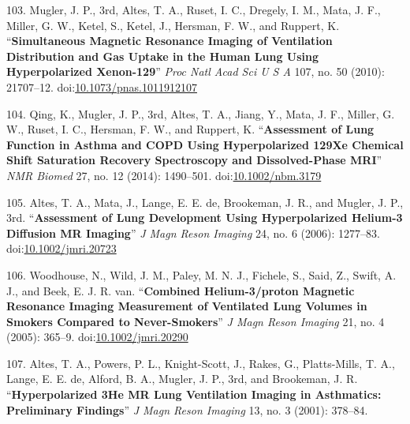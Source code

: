 \documentclass[11pt,]{article}
\begin{document}
\hypertarget{ref-Mugler:2010aa}{}
103. Mugler, J. P., 3rd, Altes, T. A., Ruset, I. C., Dregely, I. M.,
Mata, J. F., Miller, G. W., Ketel, S., Ketel, J., Hersman, F. W., and
Ruppert, K. ``\textbf{Simultaneous Magnetic Resonance Imaging of
Ventilation Distribution and Gas Uptake in the Human Lung Using
Hyperpolarized Xenon-129}'' \emph{Proc Natl Acad Sci U S A} 107, no. 50
(2010): 21707--12.
doi:\href{https://doi.org/10.1073/pnas.1011912107}{10.1073/pnas.1011912107}

\hypertarget{ref-Qing:2014ab}{}
104. Qing, K., Mugler, J. P., 3rd, Altes, T. A., Jiang, Y., Mata, J. F.,
Miller, G. W., Ruset, I. C., Hersman, F. W., and Ruppert, K.
``\textbf{Assessment of Lung Function in Asthma and COPD Using
Hyperpolarized 129Xe Chemical Shift Saturation Recovery Spectroscopy and
Dissolved-Phase MRI}'' \emph{NMR Biomed} 27, no. 12 (2014): 1490--501.
doi:\href{https://doi.org/10.1002/nbm.3179}{10.1002/nbm.3179}

\hypertarget{ref-Altes:2006aa}{}
105. Altes, T. A., Mata, J., Lange, E. E. de, Brookeman, J. R., and
Mugler, J. P., 3rd. ``\textbf{Assessment of Lung Development Using
Hyperpolarized Helium-3 Diffusion MR Imaging}'' \emph{J Magn Reson
Imaging} 24, no. 6 (2006): 1277--83.
doi:\href{https://doi.org/10.1002/jmri.20723}{10.1002/jmri.20723}

\hypertarget{ref-Woodhouse:2005aa}{}
106. Woodhouse, N., Wild, J. M., Paley, M. N. J., Fichele, S., Said, Z.,
Swift, A. J., and Beek, E. J. R. van. ``\textbf{Combined Helium-3/proton
Magnetic Resonance Imaging Measurement of Ventilated Lung Volumes in
Smokers Compared to Never-Smokers}'' \emph{J Magn Reson Imaging} 21, no.
4 (2005): 365--9.
doi:\href{https://doi.org/10.1002/jmri.20290}{10.1002/jmri.20290}

\hypertarget{ref-Altes:2001aa}{}
107. Altes, T. A., Powers, P. L., Knight-Scott, J., Rakes, G.,
Platts-Mills, T. A., Lange, E. E. de, Alford, B. A., Mugler, J. P., 3rd,
and Brookeman, J. R. ``\textbf{Hyperpolarized 3He MR Lung Ventilation
Imaging in Asthmatics: Preliminary Findings}'' \emph{J Magn Reson
Imaging} 13, no. 3 (2001): 378--84.
\end{document}
